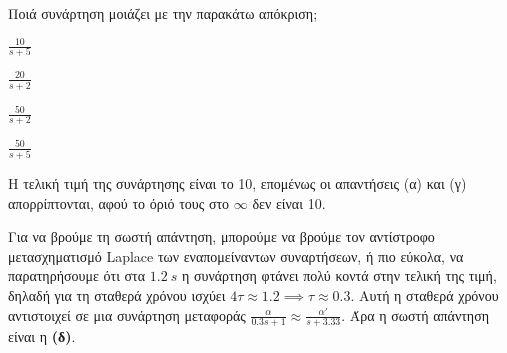\documentclass[11pt,a4paper,notitlepage,fleqn,final]{article}
\begin{document}
\begin{exercise}
Ποιά συνάρτηση μοιάζει με την παρακάτω απόκριση;


\begin{enumlatin}
    \item \( \displaystyle \frac{10}{s+5} \)
	\item \( \displaystyle \frac{20}{s+2} \)
	\item \( \displaystyle \frac{50}{s+2} \)
	\item \( \displaystyle \frac{50}{s+5} \)
\end{enumlatin}

\tcblower

Η τελική τιμή της συνάρτησης είναι το 10, επομένως οι απαντήσεις (α) και (γ) απορρίπτονται, αφού το όριό τους στο \( \infty \)
δεν είναι 10.

Για να βρούμε τη σωστή απάντηση, μπορούμε να βρούμε τον αντίστροφο μετασχηματισμό Laplace των εναπομείναντων συναρτήσεων, ή
πιο εύκολα, να παρατηρήσουμε ότι στα \( \SI{1.2}{s} \) η συνάρτηση φτάνει πολύ κοντά στην τελική της τιμή, δηλαδή
για τη σταθερά χρόνου ισχύει
\( 4τ \approx 1.2 \implies τ \approx 0.3 \). Αυτή η σταθερά χρόνου αντιστοιχεί σε μια συνάρτηση μεταφοράς \( \frac{α}{0.3s+1}
\approx \frac{α'}{s+3.33} \). Άρα η σωστή απάντηση είναι η \textbf{(δ)}.

\end{exercise}
\end{document}
